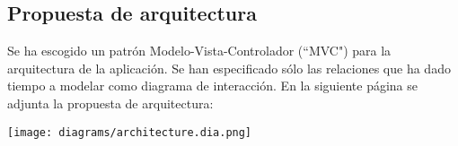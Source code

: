 \subsection{Propuesta de arquitectura}

Se ha escogido un patrón Modelo-Vista-Controlador (``MVC") para la arquitectura de la aplicación. Se han especificado sólo las relaciones que ha dado tiempo a modelar como diagrama de interacción. En la siguiente página se adjunta la propuesta de arquitectura:

\clearpage

\begin{sidewaysfigure}
    \texttt{[image: diagrams/architecture.dia.png]}
\end{sidewaysfigure}

\clearpage

